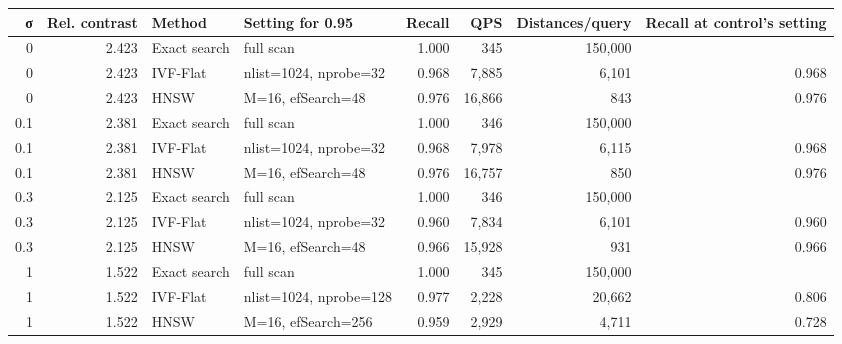 \begin{tabular}{rrllrrrr}
\toprule
σ & Rel. contrast & Method & Setting for 0.95 & Recall & QPS & Distances/query & Recall at control's setting \\
\midrule
0 & 2.423 & Exact search & full scan & 1.000 & 345 & 150,000 &  \\
0 & 2.423 & IVF-Flat & nlist=1024, nprobe=32 & 0.968 & 7,885 & 6,101 & 0.968 \\
0 & 2.423 & HNSW & M=16, efSearch=48 & 0.976 & 16,866 & 843 & 0.976 \\
0.1 & 2.381 & Exact search & full scan & 1.000 & 346 & 150,000 &  \\
0.1 & 2.381 & IVF-Flat & nlist=1024, nprobe=32 & 0.968 & 7,978 & 6,115 & 0.968 \\
0.1 & 2.381 & HNSW & M=16, efSearch=48 & 0.976 & 16,757 & 850 & 0.976 \\
0.3 & 2.125 & Exact search & full scan & 1.000 & 346 & 150,000 &  \\
0.3 & 2.125 & IVF-Flat & nlist=1024, nprobe=32 & 0.960 & 7,834 & 6,101 & 0.960 \\
0.3 & 2.125 & HNSW & M=16, efSearch=48 & 0.966 & 15,928 & 931 & 0.966 \\
1 & 1.522 & Exact search & full scan & 1.000 & 345 & 150,000 &  \\
1 & 1.522 & IVF-Flat & nlist=1024, nprobe=128 & 0.977 & 2,228 & 20,662 & 0.806 \\
1 & 1.522 & HNSW & M=16, efSearch=256 & 0.959 & 2,929 & 4,711 & 0.728 \\
\bottomrule
\end{tabular}
